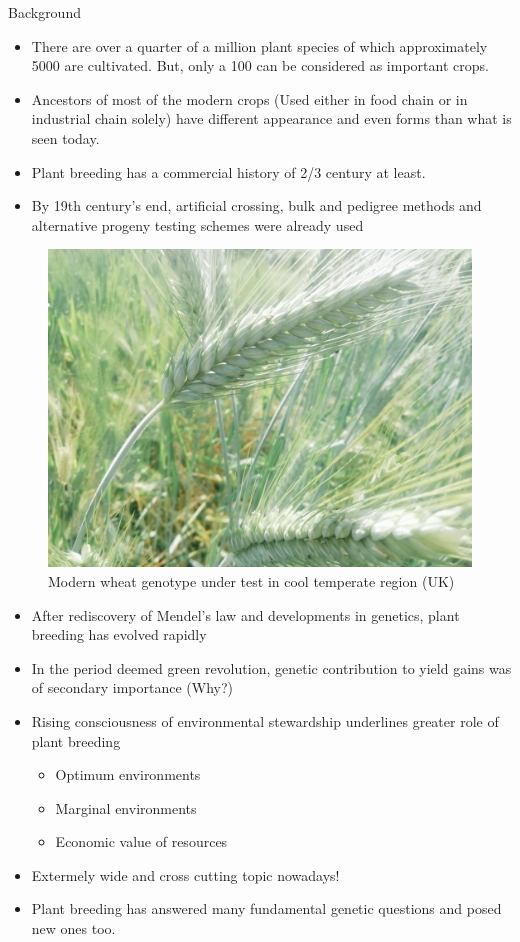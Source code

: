 \documentclass[11pt,ignorenonframetext,aspectratio=169]{beamer}
\providecommand{\tightlist}{%
  \setlength{\itemsep}{0pt}\setlength{\parskip}{0pt}}
\begin{document}
\begin{frame}{Background}
\protect\hypertarget{background}{}
\begin{itemize}
\tightlist
\item
  There are over a quarter of a million plant species of which
  approximately 5000 are cultivated. But, only a 100 can be considered
  as important crops.
\item
  Ancestors of most of the modern crops (Used either in food chain or in
  industrial chain solely) have different appearance and even forms than
  what is seen today.
\item
  Plant breeding has a commercial history of 2/3 century at least.
\item
  By 19th century's end, artificial crossing, bulk and pedigree methods
  and alternative progeny testing schemes were already used
\end{itemize}

\begin{figure}
\includegraphics[width=0.55\linewidth]{./images/Triticum3} \caption{Modern wheat genotype under test in cool temperate region (UK)}\label{fig:modern-triticum-uk}
\end{figure}
\end{frame}

\begin{frame}{}
\protect\hypertarget{section-3}{}
\begin{itemize}
\tightlist
\item
  After rediscovery of Mendel's law and developments in genetics, plant
  breeding has evolved rapidly
\item
  In the period deemed green revolution, genetic contribution to yield
  gains was of secondary importance (Why?)
\item
  Rising consciousness of environmental stewardship underlines greater
  role of plant breeding

  \begin{itemize}
  \tightlist
  \item
    Optimum environments
  \item
    Marginal environments
  \item
    Economic value of resources
  \end{itemize}
\item
  Extermely wide and cross cutting topic nowadays!
\item
  Plant breeding has answered many fundamental genetic questions and
  posed new ones too.
\end{itemize}
\end{frame}
\end{document}
